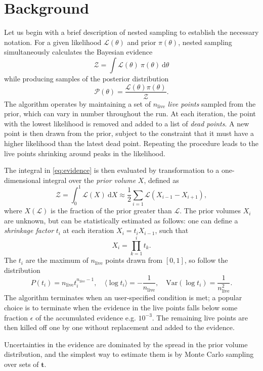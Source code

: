 \documentclass[usenatbib]{mnras}
\newcommand{\nlive}{n_\mathrm{live}}
\begin{document}
\section{Background}\label{sec:Background}
Let us begin with a brief description of nested sampling to establish the necessary notation. For a given likelihood $\mathcal{L}(\theta)$ and prior $\pi(\theta)$, nested sampling simultaneously calculates the Bayesian evidence
\begin{equation}\label{eq:evidence}
	\mathcal{Z} = \int \mathcal{L}(\theta)\ \pi(\theta)\ \mathrm{d}\theta
\end{equation}
while producing samples of the posterior distribution
\begin{equation}
	\mathcal{P}(\theta) = \frac{\mathcal{L}(\theta) \pi(\theta)}{\mathcal{Z}}.
\end{equation}
The algorithm operates by maintaining a set of $\nlive$ \textit{live points} sampled from the prior, which can vary in number throughout the run. At each iteration, the point with the lowest likelihood is removed and added to a list of \textit{dead points}. A new point is then drawn from the prior, subject to the constraint that it must have a higher likelihood than the latest dead point. Repeating the procedure leads to the live points shrinking around peaks in the likelihood.
\par
The integral in \cref{eq:evidence} is then evaluated by transformation to a one-dimensional integral over the \textit{prior volume} $X$, defined as
\begin{equation}
	\mathcal{Z} = \int_0^1 \mathcal{L}(X)\ \mathrm{d}X \approx \frac{1}{2}\sum_{i=1} \mathcal{L}(X_{i-1}-X_{i+1}),
\end{equation}
where $X(\mathcal{L})$ is the fraction of the prior greater than $\mathcal{L}$. The prior volumes $X_i$ are unknown, but can be statistically estimated as follows: one can define a \textit{shrinkage factor} $t_i$ at each iteration $X_{i} = t_i X_{i-1}$, such that
\begin{equation}\label{eq:X_dist}
	X_i = \prod_{k=1}^i t_k.
\end{equation}
The $t_i$ are the maximum of $\nlive$ points drawn from $[0,1]$, so follow the distribution
\begin{equation}\label{eq:t_dist}
	P(t_i) = \nlive t_i^{\nlive-1}, \quad \langle\log t_i\rangle = -\frac{1}{\nlive}, \quad \mathrm{Var}(\log t_i) = \frac{1}{\nlive^2}.
\end{equation}
The algorithm terminates when an user-specified condition is met; a popular choice is to terminate when the evidence in the live points falls below some fraction $\epsilon$ of the accumulated evidence e.g. $10^{-3}$. The remaining live points are then killed off one by one without replacement and added to the evidence.
\par
Uncertainties in the evidence are dominated by the spread in the prior volume distribution, and the simplest way to estimate them is by Monte Carlo sampling over sets of $\bm{t}$.
\end{document}
